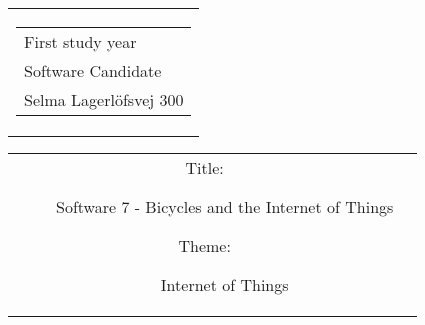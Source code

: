 

\thispagestyle{empty}
\begin{titlingpage}
 \begin{nopagebreak}
 {\samepage 
 \begin{tabular}{r}
\parbox{\textwidth}{  
 \hfill \parbox{4.9cm}{\begin{tabular}{l}
{\small First study year} \\
{\small Software Candidate} \\
{\small Selma Lagerlöfsvej 300} \\
 \end{tabular}}
}
\end{tabular}

 \begin{tabular}{cc}
\parbox{7cm}{
\begin{description}

\item[Title:] 

Software 7 - Bicycles and the Internet of Things
  
\item[Theme:]

Internet of Things


 \end{description}

\parbox{8cm}{

}}
\end{tabular}}
\end{nopagebreak}
\end{titlingpage}
